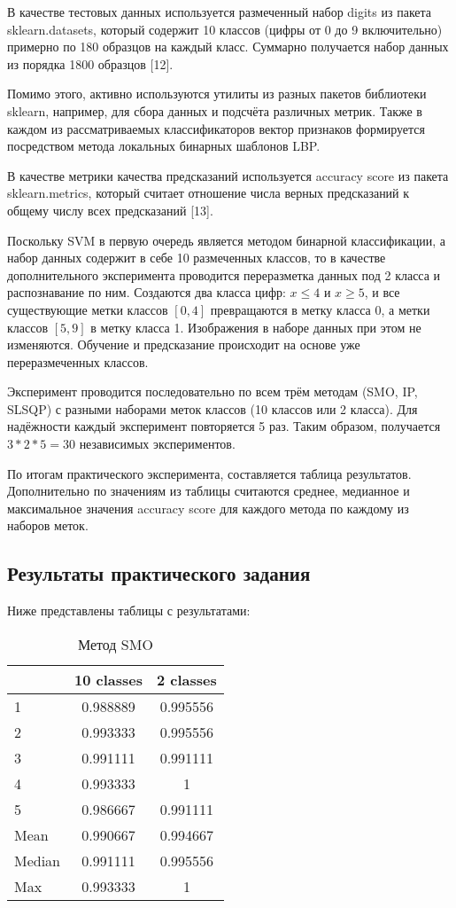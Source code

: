 В качестве тестовых данных используется размеченный набор digits из пакета sklearn.datasets, который содержит 10 классов (цифры от 0 до 9 включительно) примерно по 180 образцов на каждый класс. Суммарно получается набор данных из порядка 1800 образцов [12].

Помимо этого, активно используются утилиты из разных пакетов библиотеки sklearn, например, для сбора данных и подсчёта различных метрик. Также в каждом из рассматриваемых классификаторов вектор признаков формируется посредством метода локальных бинарных шаблонов LBP.

В качестве метрики качества предсказаний используется accuracy score из пакета sklearn.metrics, который считает отношение числа верных предсказаний к общему числу всех предсказаний [13].

Поскольку SVM в первую очередь является методом бинарной классификации, а набор данных содержит в себе 10 размеченных классов, то в качестве дополнительного эксперимента проводится переразметка данных под 2 класса и распознавание по ним. Создаются два класса цифр: $x \leq 4$ и $x \geq 5$, и все существующие метки классов $[0, 4]$ превращаются в метку класса 0, а метки классов $[5, 9]$ в метку класса 1. Изображения в наборе данных при этом не изменяются. Обучение и предсказание происходит на основе уже переразмеченных классов.

Эксперимент проводится последовательно по всем трём методам (SMO, IP, SLSQP) с разными наборами меток классов (10 классов или 2 класса). Для надёжности каждый эксперимент повторяется 5 раз. Таким образом, получается $3 * 2 * 5 = 30$ независимых экспериментов.

По итогам практического эксперимента, составляется таблица результатов. Дополнительно по значениям из таблицы считаются среднее, медианное и максимальное значения accuracy score для каждого метода по каждому из наборов меток.

\subsection{Результаты практического задания}
Ниже представлены таблицы с результатами:

\begin{table}[H]
    \centering
    \begin{tabular}{|l||c|c|}
        \hline
        & 10 classes & 2 classes \\\hline\hline
        1 & 0.988889 & 0.995556 \\\hline
        2 & 0.993333 & 0.995556 \\\hline
        3 & 0.991111 & 0.991111 \\\hline
        4 & 0.993333 & 1 \\\hline
        5 & 0.986667 & 0.991111 \\\hline
        Mean & 0.990667 & 0.994667 \\\hline
        Median & 0.991111 & 0.995556 \\\hline
        Max & 0.993333 & 1 \\\hline
    \end{tabular}
    \caption{Метод SMO}
\end{table}

